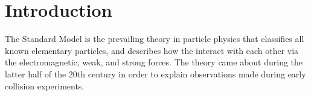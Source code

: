 
\chapter{Introduction}
The Standard Model is the prevailing theory in particle physics that classifies all known elementary particles, and describes how the interact with each other via the electromagnetic, weak, and strong forces. The theory came about during the latter half of the 20th century in order to explain observations made during early collision experiments.
